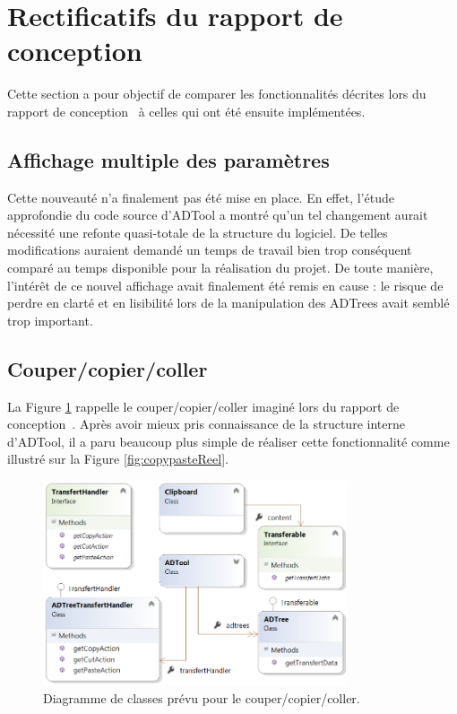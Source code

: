 \newpage
\section{Rectificatifs du rapport de conception}
\label{sec:rectConc}
    
    Cette section a pour objectif de comparer les fonctionnalités décrites lors du rapport de conception~\cite{conception} à celles qui ont été ensuite implémentées.

	\subsection{Affichage multiple des paramètres}

    Cette nouveauté n'a finalement pas été mise en place. En effet, l'étude approfondie du code source d'ADTool a montré qu'un tel changement aurait nécessité une refonte quasi-totale de la structure du logiciel. De telles modifications auraient demandé un temps de travail bien trop conséquent comparé au temps disponible pour la réalisation du projet. De toute manière, l'intérêt de ce nouvel affichage avait finalement été remis en cause : le risque de perdre en clarté et en lisibilité lors de la manipulation des ADTrees avait semblé trop important.

	\subsection{Couper/copier/coller}

	La {\sc Figure} \ref{fig:copypastePrevu} rappelle le couper/copier/coller imaginé lors du rapport de conception~\cite{conception}. Après avoir mieux pris connaissance de la structure interne d'ADTool, il a paru beaucoup plus simple de réaliser cette fonctionnalité comme illustré sur la {\sc Figure} \ref{fig:copypasteReel}.
	
	
		\begin{figure}[H]
            \centering
                \includegraphics[width=0.8\textwidth]{figure/copiercoller.png}
            \caption{Diagramme de classes prévu pour le couper/copier/coller.}
            \label{fig:copypastePrevu}
        \end{figure}
        
